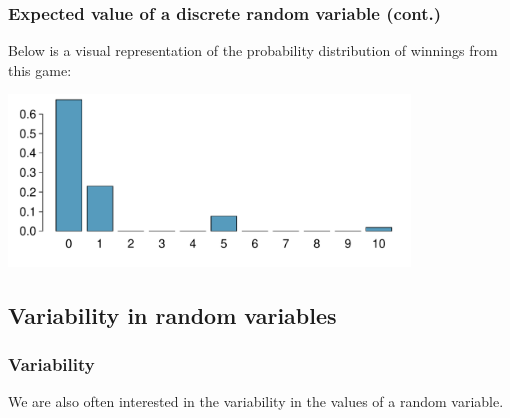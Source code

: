 \begin{frame}
\frametitle{Expected value of a discrete random variable (cont.)}

Below is a visual representation of the probability distribution of winnings from this game:

\begin{center}
\includegraphics[width=0.8\textwidth]{3-4_random_variables/figures/card_game/card_game}
\end{center}

\end{frame}


\subsection{Variability in random variables}


\begin{frame}
\frametitle{Variability}

We are also often interested in the variability in the values of a random variable.

\formula{
\[ \sigma^2 = Var(X) = \sum_{i = 1}^k (x_i - E(X))^2 P(X = x_i) \]
\[ \sigma = SD(X) = \sqrt{Var(X)} \]
}

\end{frame}


